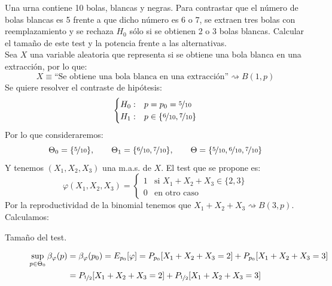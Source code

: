 \begin{ejercicio}
    Una urna contiene 10 bolas, blancas y negras. Para contrastar que el número de bolas blancas es 5 frente a que dicho número es 6 o 7, se extraen tres bolas con reemplazamiento y se rechaza $H_0$ sólo si se obtienen 2 o 3 bolas blancas. Calcular el tamaño de este test y la potencia frente a las alternativas.\\

    \noindent 
    Sea $X$ una variable aleatoria que representa si se obtiene una bola blanca en una extracción, por lo que:
    \begin{equation*}
        X\equiv \text{``Se obtiene una bola blanca en una extracción''} \rightsquigarrow B(1,p)
    \end{equation*}
    Se quiere resolver el contraste de hipótesis:
    \begin{equation*}
        \begin{cases}
            H_0 :& p = p_0 =  \nicefrac{5}{10} \\
            H_1 :& p \in \{\nicefrac{6}{10}, \nicefrac{7}{10}\}
        \end{cases}
    \end{equation*}
    Por lo que consideraremos:
    \begin{equation*}
        \Theta_0 = \{\nicefrac{5}{10}\}, \qquad \Theta_1 = \{\nicefrac{6}{10}, \nicefrac{7}{10}\}, \qquad \Theta = \{\nicefrac{5}{10}, \nicefrac{6}{10}, \nicefrac{7}{10}\}
    \end{equation*}
    Y tenemos $(X_1, X_2, X_3)$ una m.a.s. de $X$. El test que se propone es:
    \begin{equation*}
        \varphi(X_1, X_2, X_3) = \left\{\begin{array}{ll}
            1 & \text{si\ } X_1+X_2+X_3 \in \{2,3\} \\
            0 & \text{en otro caso\ } 
        \end{array}\right. 
    \end{equation*}
    Por la reproductividad de la binomial tenemos que $X_1+X_2+X_3\rightsquigarrow B(3,p)$. Calculamos: 
    \begin{description}
        \item [Tamaño del test.] 
            \begin{align*}
                \sup_{p\in \Theta_0} \beta_\varphi(p) &= \beta_\varphi(p_0) = E_{p_0}[\varphi] = P_{p_0}[X_1+X_2+X_3 = 2] + P_{p_0}[X_1 + X_2 + X_3 = 3] \\
                                                      &= P_{\nicefrac{1}{2}}[X_1+X_2+X_3 = 2] + P_{\nicefrac{1}{2}}[X_1 + X_2 + X_3 = 3]  \\

\end{align*}
\end{description}
\end{ejercicio}
